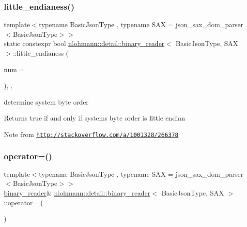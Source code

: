 \subsubsection{\texorpdfstring{little\+\_\+endianess()}{little\_endianess()}}
{\footnotesize\ttfamily template$<$typename Basic\+Json\+Type , typename S\+AX  = json\+\_\+sax\+\_\+dom\+\_\+parser$<$\+Basic\+Json\+Type$>$$>$ \\
static constexpr bool \hyperlink{classnlohmann_1_1detail_1_1binary__reader}{nlohmann\+::detail\+::binary\+\_\+reader}$<$ Basic\+Json\+Type, S\+AX $>$\+::little\+\_\+endianess (\begin{DoxyParamCaption}\item[{int}]{num = {} }\end{DoxyParamCaption})\hspace{0.3cm}{\ttfamily [inline]}, {\ttfamily [static]}, {\ttfamily [noexcept]}}



determine system byte order 

\begin{DoxyReturn}{Returns}
true if and only if system\textquotesingle{}s byte order is little endian
\end{DoxyReturn}
\begin{DoxyNote}{Note}
from \href{http://stackoverflow.com/a/1001328/266378}{\tt http\+://stackoverflow.\+com/a/1001328/266378} 
\end{DoxyNote}
\mbox{\label{classnlohmann_1_1detail_1_1binary__reader_a87826b833ee7fec146c97233bb0f6ab8}} 
\subsubsection{\texorpdfstring{operator=()}{operator=()}\hspace{0.1cm}{\footnotesize\ttfamily [1/2]}}
{\footnotesize\ttfamily template$<$typename Basic\+Json\+Type , typename S\+AX  = json\+\_\+sax\+\_\+dom\+\_\+parser$<$\+Basic\+Json\+Type$>$$>$ \\
\hyperlink{classnlohmann_1_1detail_1_1binary__reader}{binary\+\_\+reader}\& \hyperlink{classnlohmann_1_1detail_1_1binary__reader}{nlohmann\+::detail\+::binary\+\_\+reader}$<$ Basic\+Json\+Type, S\+AX $>$\+::operator= (\begin{DoxyParamCaption}\item[{const \hyperlink{classnlohmann_1_1detail_1_1binary__reader}{binary\+\_\+reader}$<$ Basic\+Json\+Type, S\+AX $>$ \&}]{ }\end{DoxyParamCaption})\hspace{0.3cm}{\ttfamily [delete]}}

